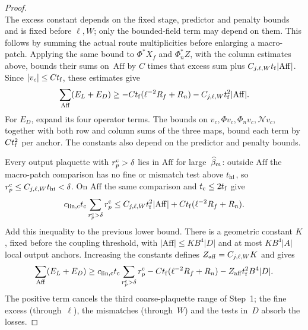 \begin{proof}
\begin{equation*}
\end{equation*}
The excess constant depends on the fixed stage, predictor and penalty bounds and is fixed before $\ell,W$; only the bounded-field term may depend on them. This follows by summing the actual route multiplicities before enlarging a macro-patch. Applying the same bound to $\Phi^*X_f$ and $\Phi_n^*Z$, with the column estimates above, bounds their sums on~$\mathrm{Aff}$ by $C$ times that excess sum plus $C_{j,\ell,W}t_{\rm f}|\mathrm{Aff}|$. Since $|v_c|\le Ct_{\rm f}$, these estimates give
\begin{equation*}
\sum_{\mathrm{Aff}}(E_L+E_D)\ge-Ct_{\rm f}(\ell^{-2}R_f+R_n)-C_{j,\ell,W}t_{\rm f}^2|\mathrm{Aff}|.
\end{equation*}
For $E_D$, expand its four operator terms. The bounds on $v_c,\Phi v_c,\Phi_nv_c,\mathcal Nv_c$, together with both row and column sums of the three maps, bound each term by $Ct_{\rm f}^2$ per anchor. The constants also depend on the predictor and penalty bounds.

Every output plaquette with $r^{\rm c}_p>\delta$ lies in $\mathrm{Aff}$ for large~$\widehat{\beta}_m$: outside $\mathrm{Aff}$ the macro-patch comparison has no fine or mismatch test above $t_{\rm hi}$, so $r^{\rm c}_p\le C_{j,\ell,W}t_{\rm hi}<\delta$. On $\mathrm{Aff}$ the same comparison and $t_{\rm c}\le2t_{\rm f}$ give
\begin{equation*}
c_{{\rm lin},{\rm c}}t_{\rm c}\sum_{r^{\rm c}_p>\delta}r^{\rm c}_p
\le C_{j,\ell,W}t_{\rm f}^2|\mathrm{Aff}|+Ct_{\rm f}(\ell^{-2}R_f+R_n).
\end{equation*}
Add this inequality to the previous lower bound. There is a geometric constant $K$, fixed before the coupling threshold, with $|\mathrm{Aff}|\le KB^4|D|$ and at most $KB^4|A|$ local output anchors. Increasing the constants defines $Z_{\rm aff}=C_{j,\ell,W}K$ and gives
\begin{equation*}
\sum_{\mathrm{Aff}}(E_L+E_D)\ge c_{{\rm lin},{\rm c}}t_{\rm c}\sum_{r^{\rm c}_p>\delta}r^{\rm c}_p
-Ct_{\rm f}(\ell^{-2}R_f+R_n)-Z_{\rm aff}t_{\rm f}^2B^4|D|.
\end{equation*}
The positive term cancels the third coarse-plaquette range of Step~1; the fine excess (through~$\ell$), the mismatches (through~$W$) and the tests in~$D$ absorb the losses.


\end{proof}
